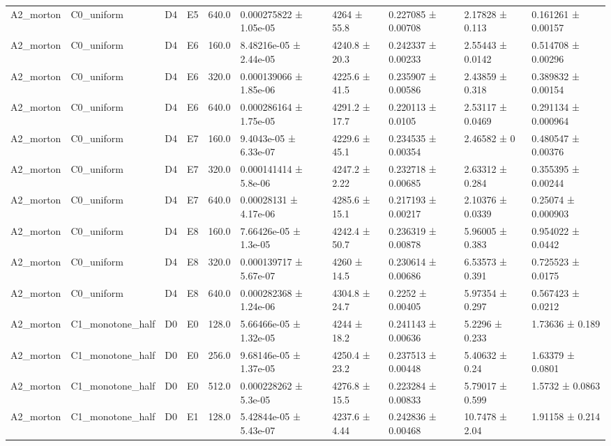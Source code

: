 \begin{table}
\begin{tabular}{llllllllll}
A2\_morton & C0\_uniform & D4 & E5 & 640.0 & 0.000275822 ± 1.05e-05 & 4264 ± 55.8 & 0.227085 ± 0.00708 & 2.17828 ± 0.113 & 0.161261 ± 0.00157 \\
A2\_morton & C0\_uniform & D4 & E6 & 160.0 & 8.48216e-05 ± 2.44e-05 & 4240.8 ± 20.3 & 0.242337 ± 0.00233 & 2.55443 ± 0.0142 & 0.514708 ± 0.00296 \\
A2\_morton & C0\_uniform & D4 & E6 & 320.0 & 0.000139066 ± 1.85e-06 & 4225.6 ± 41.5 & 0.235907 ± 0.00586 & 2.43859 ± 0.318 & 0.389832 ± 0.00154 \\
A2\_morton & C0\_uniform & D4 & E6 & 640.0 & 0.000286164 ± 1.75e-05 & 4291.2 ± 17.7 & 0.220113 ± 0.0105 & 2.53117 ± 0.0469 & 0.291134 ± 0.000964 \\
A2\_morton & C0\_uniform & D4 & E7 & 160.0 & 9.4043e-05 ± 6.33e-07 & 4229.6 ± 45.1 & 0.234535 ± 0.00354 & 2.46582 ± 0 & 0.480547 ± 0.00376 \\
A2\_morton & C0\_uniform & D4 & E7 & 320.0 & 0.000141414 ± 5.8e-06 & 4247.2 ± 2.22 & 0.232718 ± 0.00685 & 2.63312 ± 0.284 & 0.355395 ± 0.00244 \\
A2\_morton & C0\_uniform & D4 & E7 & 640.0 & 0.00028131 ± 4.17e-06 & 4285.6 ± 15.1 & 0.217193 ± 0.00217 & 2.10376 ± 0.0339 & 0.25074 ± 0.000903 \\
A2\_morton & C0\_uniform & D4 & E8 & 160.0 & 7.66426e-05 ± 1.3e-05 & 4242.4 ± 50.7 & 0.236319 ± 0.00878 & 5.96005 ± 0.383 & 0.954022 ± 0.0442 \\
A2\_morton & C0\_uniform & D4 & E8 & 320.0 & 0.000139717 ± 5.67e-07 & 4260 ± 14.5 & 0.230614 ± 0.00686 & 6.53573 ± 0.391 & 0.725523 ± 0.0175 \\
A2\_morton & C0\_uniform & D4 & E8 & 640.0 & 0.000282368 ± 1.24e-06 & 4304.8 ± 24.7 & 0.2252 ± 0.00405 & 5.97354 ± 0.297 & 0.567423 ± 0.0212 \\
A2\_morton & C1\_monotone\_half & D0 & E0 & 128.0 & 5.66466e-05 ± 1.32e-05 & 4244 ± 18.2 & 0.241143 ± 0.00636 & 5.2296 ± 0.233 & 1.73636 ± 0.189 \\
A2\_morton & C1\_monotone\_half & D0 & E0 & 256.0 & 9.68146e-05 ± 1.37e-05 & 4250.4 ± 23.2 & 0.237513 ± 0.00448 & 5.40632 ± 0.24 & 1.63379 ± 0.0801 \\
A2\_morton & C1\_monotone\_half & D0 & E0 & 512.0 & 0.000228262 ± 5.3e-05 & 4276.8 ± 15.5 & 0.223284 ± 0.00833 & 5.79017 ± 0.599 & 1.5732 ± 0.0863 \\
A2\_morton & C1\_monotone\_half & D0 & E1 & 128.0 & 5.42844e-05 ± 5.43e-07 & 4237.6 ± 4.44 & 0.242836 ± 0.00468 & 10.7478 ± 2.04 & 1.91158 ± 0.214 \\

\end{tabular}
\end{table}
